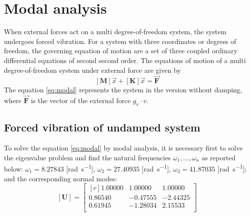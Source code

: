 \chapter{Modal analysis}\label{chap:modalanalysis}
When external forces act on a multi degree-of-freedom system, the system
undergoes forced vibration.
For a system with three coordinates or degrees of freedom, the governing
equation of motion are a set of three coupled ordinary differential equations of
second second order.
The equations of motion of a multi degree-of-freedom system under external force
are given by
\begin{equation}
  \label{eq:modal}
  [\mathbf{M}] \ddot{\vec{x}} + [\mathbf{K}] \vec{x} = \vec{\mathbf{F}}
\end{equation}
The equation \eqref{eq:modal} represents the system in the version without
damping, where \(\vec{\mathbf{F}}\) is the vector of the external force
\(g_{\text{v}} \cdot v\).
\section{Forced vibration of undamped system}\label{sec:eigen}
To solve the equation \eqref{eq:modal} by modal analysis, it is necessary first
to solve the eigenvalue problem and find the natural frequencies \(\omega_1,
\dots, \omega_n\) as reported below:
\(\omega_{1} = 8.27843\) [\si{\radian\per\second}],
\(\omega_{2} = 27.40935\) [\si{\radian\per\second}],
\(\omega_{3} = 41.87035\) [\si{\radian\per\second}];
and the corresponding normal modes:
\begin{equation}
	\label{eq:eiegnmodefree}
 	[\mathbf{U}] = \begin{bmatrix*}[r]
 		1.00000 & 1.00000 & 1.00000 \\
		0.86540 &-0.47555 &-2.44325 \\
		0.61945 &-1.28034 & 2.15533 \\
 	\end{bmatrix*}
\end{equation}
